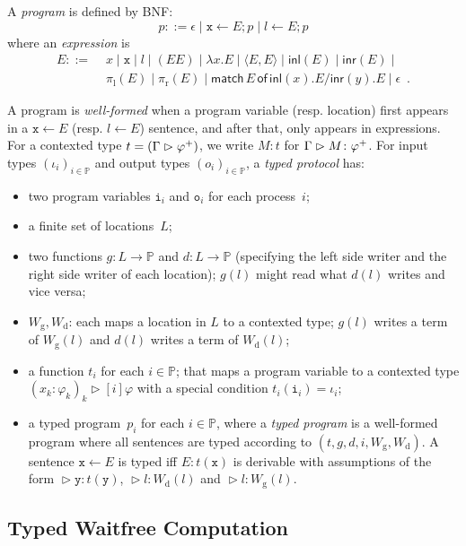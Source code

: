 \documentclass[doctor]{iscs-thesis}
\newcommand{\tuple}[1]{\langle{#1}\rangle}
\newcommand{\tr}{\vartriangleright}
\newcommand{\processes}{\mathbb{P}}
\newcommand{\p}[1]{\texttt{#1}}
\newcommand{\linl}[1]{\mathsf{inl}\left({#1}\right)}
\newcommand{\linr}[1]{\mathsf{inr}\left({#1}\right)}
\newcommand{\lpil}[1]{\pi_{\mathrm l}\left({#1}\right)}
\newcommand{\lpir}[1]{\pi_{\mathrm r}\left({#1}\right)}
\newcommand{\lmat}[5]{\mathsf{match}\,{#1}\,\mathsf{of}\, \linl{#2}. {#3}/
\linr{#4}. {#5}}
\newcommand{\tj}   [2]{ {#1} \colon{#2} }
\begin{document}
A \textit{program} is defined by BNF:
\[
 p ::= \epsilon\mid
 \p x\leftarrow E; p \mid
 l \leftarrow E; p
\]
where an \textit{expression} is
\begin{align*}
 E
 ::=\,\,
 &x\mid \p x \mid l \mid (EE)\mid \lambda
 x.E\mid \tuple{E,E}\mid \linl{E}\mid \linr{E}\mid \\
 &\lpil{E}\mid\lpir{E}\mid  \lmat E x {E} y {E}\mid \epsilon\enspace.
\end{align*}

\newcommand{\Wg}{W_{\mathrm g}}
\newcommand{\Wd}{W_{\mathrm d}}
A program is \textit{well-formed} when
a program variable (resp. location) first appears in a $\p x\leftarrow E$
(resp. $l\leftarrow E$)
sentence, and
after that, only appears in expressions.
For a contexted type $t = (\Gamma\tr\m\varphi)$,
we write $\tj{M}{t}$ for
$\Gamma\tr\tj{M}{\m\varphi}$.
For input types $(\iota_i)_{i\in\processes}$
and output types $(o_i)_{i\in\processes}$, 
a \textit{typed protocol} has:
\begin{itemize}
 \item two program variables
      $\p i_i$ and $\p o_i$ for each process~$i$;
 \item a finite set of locations~$L$;
 \item two functions $g\colon L\rightarrow \processes$
       and $d\colon L\rightarrow
       \processes$ (specifying the left side writer and the right side writer of
       each location);
       $g(l)$ might read what $d(l)$ writes and vice versa;
 \item $\Wg, \Wd$: each maps a location in $L$ to a contexted type;
       $g(l)$ writes a term of $\Wg(l)$ and $d(l)$ writes a term of $\Wd(l)$;
 \item a function $t_i$ for each $i\in \processes$;
       that maps a program variable to a contexted type
       $(\tj{x_k}{\varphi_k})_k \tr[i]\varphi$ with a special condition
       $t_i(\p i_i)= \iota_i$;
 \item a typed program~$p_i$ for each $i\in \processes$,
       where
a \textit{typed program} is a well-formed program where all
sentences are typed according to $(t,g,d,i,\Wg, \Wd)$.
A sentence $\p x \leftarrow E$ is typed  iff $E\colon t(\p x)$ is derivable with
assumptions of the form $\tr\tj{\p y}{t(\p y)}$,\quad
$\tr\tj{l}{W_{\mathrm d}}(l)$ and
$\tr\tj{l}{W_{\mathrm g}}(l)$.
\end{itemize}

\subsection{Typed Waitfree Computation}
\end{document}
